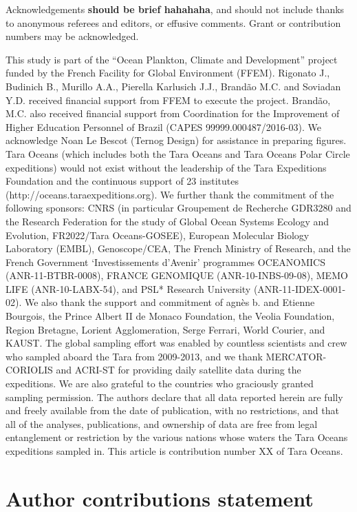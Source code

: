 \documentclass[fleqn,10pt]{wlscirep}
\begin{document}
Acknowledgements \textbf{should be brief hahahaha}, and should not include thanks to anonymous referees and editors, or effusive comments. Grant or contribution numbers may be acknowledged.

This study is part of the “Ocean Plankton, Climate and Development” project funded by the French Facility for Global Environment (FFEM). Rigonato J., Budinich B., Murillo A.A., Pierella Karlusich J.J., Brandão M.C. and Soviadan Y.D. received financial support from FFEM to execute the project. Brandão, M.C. also received financial support from Coordination for the Improvement of Higher Education Personnel of Brazil (CAPES 99999.000487/2016-03). We acknowledge Noan Le Bescot (Ternog Design) for assistance in preparing figures. Tara Oceans (which includes both the Tara Oceans and Tara Oceans Polar Circle expeditions) would not exist without the leadership of the Tara Expeditions Foundation and the continuous support of 23 institutes (http://oceans.taraexpeditions.org). We further thank the commitment of the following sponsors: CNRS (in particular Groupement de Recherche GDR3280 and the Research Federation for the study of Global Ocean Systems Ecology and Evolution, FR2022/Tara Oceans-GOSEE), European Molecular Biology Laboratory (EMBL), Genoscope/CEA, The French Ministry of Research, and the French Government ‘Investissements d’Avenir’ programmes OCEANOMICS (ANR-11-BTBR-0008), FRANCE GENOMIQUE (ANR-10-INBS-09-08), MEMO LIFE (ANR-10-LABX-54), and PSL* Research University (ANR-11-IDEX-0001-02). We also thank the support and commitment of agnès b. and Etienne Bourgois, the Prince Albert II de Monaco Foundation, the Veolia Foundation, Region Bretagne, Lorient Agglomeration, Serge Ferrari, World Courier, and KAUST. The global sampling effort was enabled by countless scientists and crew who sampled aboard the Tara from 2009-2013, and we thank MERCATOR-CORIOLIS and ACRI-ST for providing daily satellite data during the expeditions. We are also grateful to the countries who graciously granted sampling permission. The authors declare that all data reported herein are fully and freely available from the date of publication, with no restrictions, and that all of the analyses, publications, and ownership of data are free from legal entanglement or restriction by the various nations whose waters the Tara Oceans expeditions sampled in. This article is contribution number XX of Tara Oceans.

\section*{Author contributions statement}
\end{document}
